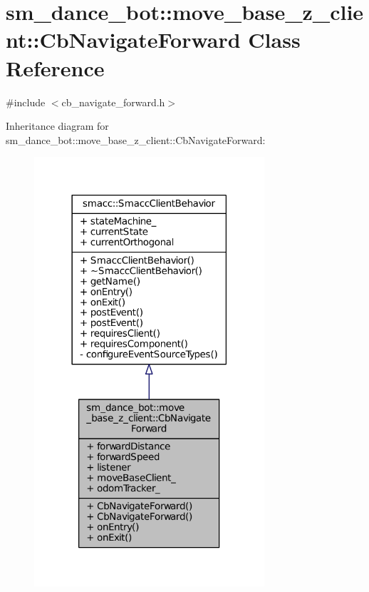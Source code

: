 \hypertarget{classsm__dance__bot_1_1move__base__z__client_1_1CbNavigateForward}{}\section{sm\+\_\+dance\+\_\+bot\+:\+:move\+\_\+base\+\_\+z\+\_\+client\+:\+:Cb\+Navigate\+Forward Class Reference}
\label{classsm__dance__bot_1_1move__base__z__client_1_1CbNavigateForward}


{\ttfamily \#include $<$cb\+\_\+navigate\+\_\+forward.\+h$>$}



Inheritance diagram for sm\+\_\+dance\+\_\+bot\+:\+:move\+\_\+base\+\_\+z\+\_\+client\+:\+:Cb\+Navigate\+Forward\+:
\nopagebreak
\begin{figure}[H]
\begin{center}
\leavevmode
\includegraphics[width=242pt]{classsm__dance__bot_1_1move__base__z__client_1_1CbNavigateForward__inherit__graph}
\end{center}
\end{figure}


